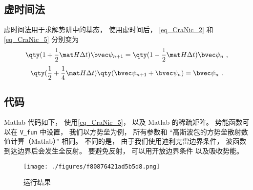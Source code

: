 \subsection{虚时间法}
虚时间法用于求解势阱中的基态， 使用虚时间后， \autoref{eq_CraNic_2} 和\autoref{eq_CraNic_5} 分别变为
\begin{equation}
\qty(1+\frac12\mat H\Delta t)\bvec\psi_{n+1} = \qty(1-\frac12\mat H\Delta t)\bvec\psi_n~,
\end{equation}
\begin{equation}
\qty(\frac12 + \frac14\mat H\Delta t)\qty(\bvec\psi_{n+1}+\bvec\psi_n) = \bvec\psi_n~.
\end{equation}

\subsection{代码}
Matlab 代码如下， 使用\autoref{eq_CraNic_5}， 以及 Matlab 的稀疏矩阵。 势能函数可以在 \verb|V_fun| 中设置， 我们以方势垒为例， 所有参数和 “高斯波包的方势垒散射数值计算（Matlab）” 相同。 不同的是， 由于我们使用迪利克雷边界条件， 波函数到达边界后会发生全反射。 要避免反射， 可以用开放边界条件%
以及吸收势能。%

\begin{figure}[ht]
\centering
\texttt{[image: ./figures/f80876421ad5b5d8.png]}
\caption{运行结果} \label{fig_CraNic_1}
\end{figure}

